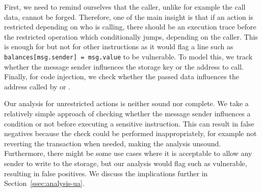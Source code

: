 First, we need to remind ourselves that the caller, unlike for example the call data, cannot be forged.
Therefore, one of the main insight is that if an action is restricted depending on who is calling, there should be an execution trace before the restricted operation which conditionally jumps, depending on the caller.
This is enough for  but not for other instructions as it would flag a line such as \lstinline{balances[msg.sender] = msg.value} to be vulnerable.
To model this, we track whether the message sender influences the storage key or the address to call.
Finally, for code injection, we check whether the passed data influences the address called by  or .

\correctness Our analysis for unrestricted actions is neither sound nor complete.
We take a relatively simple approach of checking whether the message sender influences a condition or not before executing a sensitive instruction.
This can result in false negatives because the check could be performed inappropriately, for example not reverting the transaction when needed, making the analysis unsound.
Furthermore, there might be some use cases where it is acceptable to allow any sender to write to the storage, but our analysis would flag such as vulnerable, resulting in false positives.
We discuss the implications further in Section~\ref{ssec:analysis-ua}.
